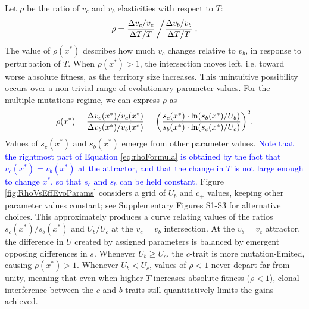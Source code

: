\documentclass[9pt,twocolumn,twoside,lineno]{gsajnl}
\begin{document}
Let $\rho$ be the ratio of $v_c$ and $v_b$ elasticities with respect to $T$:
\[ 
\rho = \frac{\Delta v_c/v_c}{\Delta T/T} \left / \frac{\Delta v_b/v_b}{\Delta T/T} \right..
\]
The value of $\rho(x^*)$ describes how much $v_c$ changes relative to $v_b$, in response to perturbation of $T$. When $\rho(x^*) > 1$, the intersection moves left, i.e. toward worse absolute fitness, as the territory size increases. This unintuitive possibility occurs over a non-trivial range of evolutionary parameter values. For the multiple-mutations regime, we can express $\rho$ as
\begin{equation}\label{eq:rhoFormula}
    \rho(x^*) = {\footnotesize \frac{\Delta v_c(x^*)/v_c(x^*)}{\Delta v_b(x^*)/v_b(x^*)} = \left(\frac{s_c(x^*)\cdot \ln(s_b(x^*)/U_b)}{s_b(x^*)\cdot\ln(s_c(x^*)/U_c)}\right)^2}.
\end{equation}
Values of $s_c(x^*)$ and $s_b(x^*)$ emerge from other parameter values. \textcolor{blue}{Note that the rightmost part of Equation \eqref{eq:rhoFormula} is obtained by the fact that $v_c(x^*)=v_b(x^*)$ at the attractor, and that the change in $T$ is not large enough to change $x^*$, so that $s_c$ and $s_b$ can be held constant.} Figure \ref{fig:RhoVsEffEvoParams} considers a grid of $U_b$ and $c_+$ values, keeping other parameter values constant; see Supplementary Figures S1-S3 for alternative choices. This approximately produces a curve relating values of the ratios $s_c(x^*)/s_b(x^*)$ and $U_b/U_c$ at the $v_c=v_b$ intersection. At the $v_b=v_c$ attractor, the difference in $U$ created by assigned parameters is balanced by emergent opposing differences in $s$. Whenever $U_b\geq U_c$, the $c$-trait is more mutation-limited, causing $\rho(x^*)>1$. Whenever $U_b< U_c$, values of $\rho<1$ never depart far from unity, meaning that even when higher $T$  increases absolute fitness ($\rho <1$), clonal interference between the $c$ and $b$ traits still quantitatively limits the gains achieved.
\end{document}
